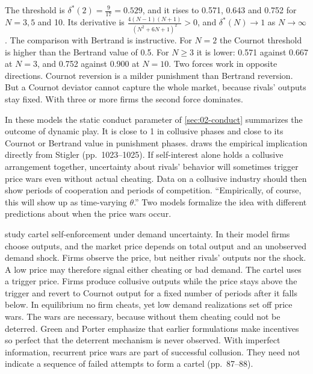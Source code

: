 The threshold is $\delta^*(2) = \frac{9}{17} = 0.529$, and it rises to 0.571, 0.643 and 0.752 for $N = 3, 5$ and
10. Its derivative is $\frac{4(N - 1)(N + 1)}{(N^2 + 6N + 1)^2} > 0$, and $\delta^*(N) \to 1$ as $N \to \infty$. The
comparison with Bertrand is instructive. For $N = 2$ the Cournot threshold is higher than the Bertrand value of
0.5. For $N \ge 3$ it is lower: 0.571 against 0.667 at $N = 3$, and 0.752 against 0.900 at $N = 10$. Two forces
work in opposite directions. Cournot reversion is a milder punishment than Bertrand reversion. But a Cournot
deviator cannot capture the whole market, because rivals' outputs stay fixed. With three or more firms the second
force dominates.

In these models the static conduct parameter of \cref{sec:02-conduct} summarizes the outcome of dynamic play. It is
close to 1 in collusive phases and close to its Cournot or Bertrand value in punishment phases. \citet{Bresnahan1989}
draws the empirical implication directly from Stigler (pp.~1023--1025). If self-interest alone holds a collusive
arrangement together, uncertainty about rivals' behavior will sometimes trigger price wars even without actual
cheating. Data on a collusive industry should then show periods of cooperation and periods of competition.
``Empirically, of course, this will show up as time-varying $\theta$.'' Two models formalize the idea with
different predictions about when the price wars occur.

\citet{GreenPorter1984} study cartel self-enforcement under demand uncertainty. In their model firms choose outputs,
and the market price depends on total output and an unobserved demand shock. Firms observe the price, but neither
rivals' outputs nor the shock. A low price may therefore signal either cheating or bad demand. The cartel uses a
trigger price. Firms produce collusive outputs while the price stays above the trigger and revert to Cournot output
for a fixed number of periods after it falls below. In equilibrium no firm cheats, yet low demand realizations set
off price wars. The wars are necessary, because without them cheating could not be deterred. Green and Porter
emphasize that earlier formulations make incentives so perfect that the deterrent mechanism is never observed. With
imperfect information, recurrent price wars are part of successful collusion. They need not indicate a sequence of
failed attempts to form a cartel (pp.~87--88).

